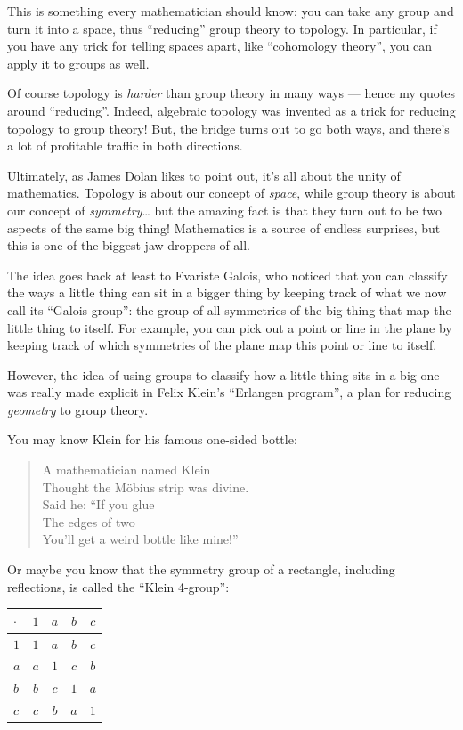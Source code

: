 \documentclass{article}
\begin{document}
This is something every mathematician should know: you can take any
group and turn it into a space, thus ``reducing'' group theory to
topology. In particular, if you have any trick for telling spaces apart,
like ``cohomology theory'', you can apply it to groups as well.

Of course topology is \emph{harder} than group theory in many ways ---
hence my quotes around ``reducing''. Indeed, algebraic topology was
invented as a trick for reducing topology to group theory! But, the
bridge turns out to go both ways, and there's a lot of profitable
traffic in both directions.

Ultimately, as James Dolan likes to point out, it's all about the unity
of mathematics. Topology is about our concept of \emph{space}, while
group theory is about our concept of \emph{symmetry}\ldots{} but the
amazing fact is that they turn out to be two aspects of the same big
thing! Mathematics is a source of endless surprises, but this is one of
the biggest jaw-droppers of all.

The idea goes back at least to Evariste Galois, who noticed that you can
classify the ways a little thing can sit in a bigger thing by keeping
track of what we now call its ``Galois group'': the group of all
symmetries of the big thing that map the little thing to itself. For
example, you can pick out a point or line in the plane by keeping track
of which symmetries of the plane map this point or line to itself.

However, the idea of using groups to classify how a little thing sits in
a big one was really made explicit in Felix Klein's ``Erlangen
program'', a plan for reducing \emph{geometry} to group theory.

You may know Klein for his famous one-sided bottle:

\begin{quote}
A mathematician named Klein\\
Thought the Möbius strip was divine.\\
Said he: ``If you glue\\
The edges of two\\
You'll get a weird bottle like mine!''\\
\end{quote}

Or maybe you know that the symmetry group of a rectangle, including
reflections, is called the ``Klein 4-group'':

\begin{longtable}[]{@{}lcccc@{}}
\toprule
\(\cdot\) & \(1\) & \(a\) & \(b\) & \(c\)\tabularnewline
\midrule
\endhead
\(1\) & \(1\) & \(a\) & \(b\) & \(c\)\tabularnewline
\(a\) & \(a\) & \(1\) & \(c\) & \(b\)\tabularnewline
\(b\) & \(b\) & \(c\) & \(1\) & \(a\)\tabularnewline
\(c\) & \(c\) & \(b\) & \(a\) & \(1\)\tabularnewline
\bottomrule
\end{longtable}
\end{document}
